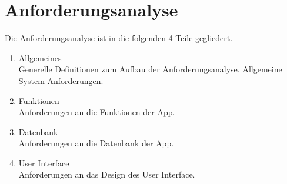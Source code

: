 \chapter{Anforderungsanalyse}

Die Anforderungsanalyse ist in die folgenden 4 Teile gegliedert.

\begin{enumerate}
	\item Allgemeines \\
	Generelle Definitionen zum Aufbau der Anforderungsanalyse. Allgemeine System Anforderungen.
	\item Funktionen \\
	Anforderungen an die Funktionen der App.
	\item Datenbank \\
	Anforderungen an die Datenbank der App.
	\item User Interface \\
	Anforderungen an das Design des User Interface.
\end{enumerate}









